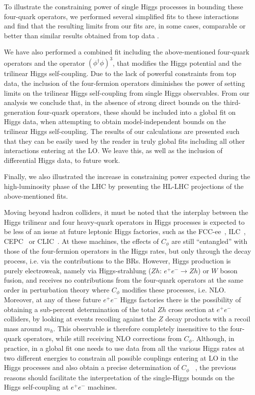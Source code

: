 \par
To illustrate the constraining power of single Higgs processes in bounding these four-quark operators, we performed several simplified fits to these interactions and find that the resulting limits from our fits are, in some cases, comparable or better than similar results obtained from top data \cite{Ethier:2021bye, Hartland:2019bjb}.
\par
We have also performed a combined fit including the above-mentioned four-quark operators and the operator $\left(\phi^\dagger \phi\right)^3$, that modifies the Higgs potential and the trilinear Higgs self-coupling. Due to the lack of powerful constraints from top data, the inclusion of the four-fermion operators diminishes the power of setting limits on the trilinear Higgs self-coupling
from single Higgs observables. 
From our analysis we conclude that, in the absence of strong direct bounds on the third-generation four-quark operators, these should be included into a global fit on Higgs data, when attempting to obtain model-independent bounds on the trilinear Higgs self-coupling. The results of our calculations are presented such that they can be easily used by the reader in truly global fits including all other interactions entering at the LO. 
We leave this, as well as the inclusion of differential Higgs data, to future work.
%

Finally, we also illustrated the increase in constraining power expected during the high-luminosity phase of the LHC by presenting the HL-LHC projections of the above-mentioned fits.  

Moving beyond hadron colliders, it must be noted that the interplay between the Higgs trilinear and four heavy-quark operators in Higgs processes is expected to be less of an issue at future leptonic Higgs factories, such as the FCC-ee~\cite{FCC:2018byv,FCC:2018evy}, ILC~\cite{Bambade:2019fyw,LCCPhysicsWorkingGroup:2019fvj}, CEPC~\cite{An:2018dwb,CEPCStudyGroup:2018ghi} or CLIC~\cite{CLICdp:2018cto,deBlas:2018mhx}. At these machines, the effects of $C_\phi$ are still ``entangled'' with those
of the four-fermion operators in the Higgs rates, but only through the decay process, i.e. via the contributions to the BRs. However, Higgs production is purely electroweak, namely via Higgs-strahlung ($Zh$: $e^+ e^- \to Zh$) or $W$ boson fusion, and receives no contributions from the four-quark operators at the same order in perturbation theory where $C_\phi$ modifies these processes, i.e. NLO. 
Moreover, at any of these future $e^+ e^-$ Higgs factories there is the possibility of obtaining a sub-percent determination of the total $Zh$ cross section at $e^+ e^-$ colliders, by looking at events recoiling against the $Z$ decay products with a recoil mass around $m_h$. This observable is therefore completely insensitive to the four-quark operators, while still receiving NLO corrections from $C_\phi$. 
Although, in practice, in a global fit one needs to use data from all the various Higgs rates at two different energies to constrain all possible couplings entering at LO in the Higgs processes and also obtain a precise determination of $C_\phi$ ~\cite{DiVita:2017vrr}, the previous reasons should facilitate the interpretation of the single-Higgs bounds on the Higgs self-coupling at $e^+e^-$ machines.

